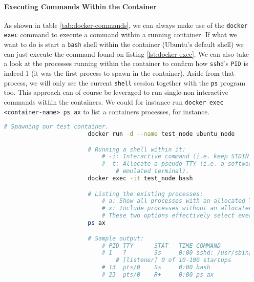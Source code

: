                 \paragraph{Executing Commands Within the Container}
                    As shown in table \ref{tab:docker-commands}, we can always make use of the \texttt{docker exec} command to execute a command within a running container. If what we want to do is start a \texttt{bash} shell within the container (Ubuntu's default shell) we can just execute the command found on listing \ref{lst:docker-exec}. We can also take a look at the processes running within the container to confirm how \texttt{sshd}'s \texttt{PID} is indeed $1$ (it was the first process to spawn in the container). Aside from that process, we will only see the current \texttt{shell} session together with the \texttt{ps} program too. This approach can of course be leveraged to run single-non interactive commands within the containers. We could for instance run \texttt{docker exec <container-name> ps ax} to list a containers processes, for instance.\\

                    \begin{lstlisting}[language = bash, caption = Inspecting a container's processes., label = lst:docker-exec]
                        # Spawning our test container.
                        docker run -d --name test_node ubuntu_node

                        # Running a shell within it:
                            # -i: Interactive command (i.e. keep STDIN open).
                            # -t: Allocate a pseudo-TTY (i.e. a software
                                # emulated terminal).
                        docker exec -it test_node bash

                        # Listing the existing processes:
                            # a: Show all processes with an allocated TTY.
                            # x: Include processes without an allocated TTY.
                            # These two options effectively select every process.
                        ps ax

                        # Sample output:
                            # PID TTY      STAT   TIME COMMAND
                            # 1   ?        Ss     0:00 sshd: /usr/sbin/sshd -D \
                                # [listener] 0 of 10-100 startups
                            # 13  pts/0    Ss     0:00 bash
                            # 23  pts/0    R+     0:00 ps ax
                    \end{lstlisting}

